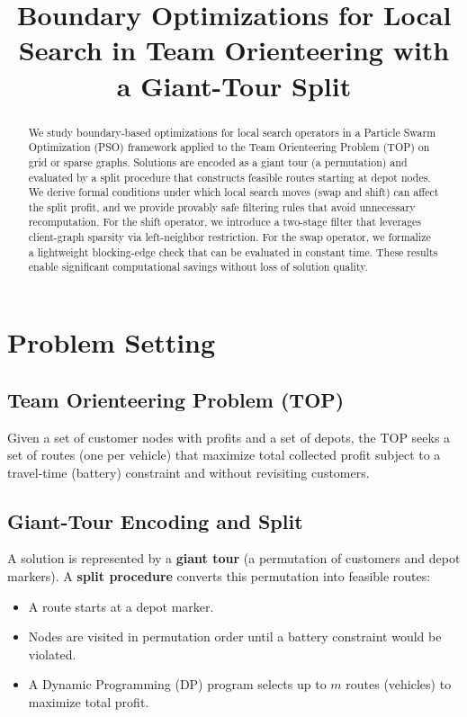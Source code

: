 \documentclass[11pt]{article}
\title{Boundary Optimizations for Local Search in Team Orienteering with a Giant-Tour Split}
\author{}
\date{}
\theoremstyle{definition}
\begin{document}
\maketitle

\begin{abstract}
We study boundary-based optimizations for local search operators in a Particle Swarm Optimization (PSO) framework applied to the Team Orienteering Problem (TOP) on grid or sparse graphs. Solutions are encoded as a giant tour (a permutation) and evaluated by a split procedure that constructs feasible routes starting at depot nodes. We derive formal conditions under which local search moves (swap and shift) can affect the split profit, and we provide provably safe filtering rules that avoid unnecessary recomputation. For the shift operator, we introduce a two-stage filter that leverages client-graph sparsity via left-neighbor restriction. For the swap operator, we formalize a lightweight blocking-edge check that can be evaluated in constant time. These results enable significant computational savings without loss of solution quality.
\end{abstract}

\section{Problem Setting}

\subsection{Team Orienteering Problem (TOP)}

Given a set of customer nodes with profits and a set of depots, the TOP seeks a set of routes (one per vehicle) that maximize total collected profit subject to a travel-time (battery) constraint and without revisiting customers.

\subsection{Giant-Tour Encoding and Split}

A solution is represented by a \textbf{giant tour} (a permutation of customers and depot markers). A \textbf{split procedure} converts this permutation into feasible routes:

\begin{itemize}
    \item A route starts at a depot marker.
    \item Nodes are visited in permutation order until a battery constraint would be violated.
    \item A Dynamic Programming (DP) program selects up to $m$ routes (vehicles) to maximize total profit.
\end{itemize}
\end{document}
